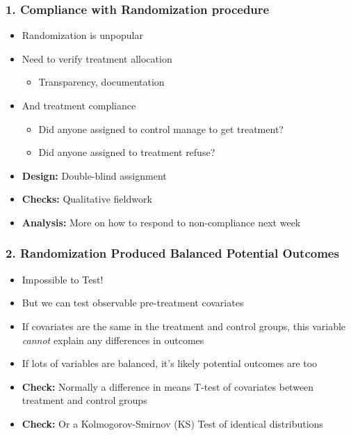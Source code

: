 \documentclass[xcolor=x11names,compress]{beamer}\usepackage[]{graphicx}\usepackage[]{color}
\renewcommand{\(}{\begin{columns}}
\renewcommand{\)}{\end{columns}}
\newcommand{\<}[1]{\begin{column}{#1}}
\renewcommand{\>}{\end{column}}
\begin{document}
\begin{frame}
\frametitle{1. Compliance with Randomization procedure}
\begin{itemize}
\item Randomization is unpopular
\pause
\item Need to verify treatment allocation
\begin{itemize}
\item Transparency, documentation
\end{itemize}
\pause
\item And treatment compliance
\begin{itemize}
\item Did anyone assigned to control manage to get treatment?
\item Did anyone assigned to treatment refuse?
\pause
\end{itemize}
\item \textbf{Design:} Double-blind assignment
\pause
\item \textbf{Checks:} Qualitative fieldwork
\pause
\item \textbf{Analysis:} More on how to respond to non-compliance next week
\end{itemize}
\end{frame}

\begin{frame}
\frametitle{2. Randomization Produced Balanced Potential Outcomes}
\begin{itemize}
\item Impossible to Test!
\pause
\item But we can test observable pre-treatment covariates
\pause
\item If covariates are the same in the treatment and control groups, this variable \textit{cannot} explain any differences in outcomes
\pause
\item If lots of variables are balanced, it's likely potential outcomes are too
\pause
\item \textbf{Check:} Normally a difference in means T-test of covariates between treatment and control groups
\pause
\item \textbf{Check:} Or a Kolmogorov-Smirnov (KS) Test of identical distributions
\end{itemize}
\end{frame}
\end{document}
